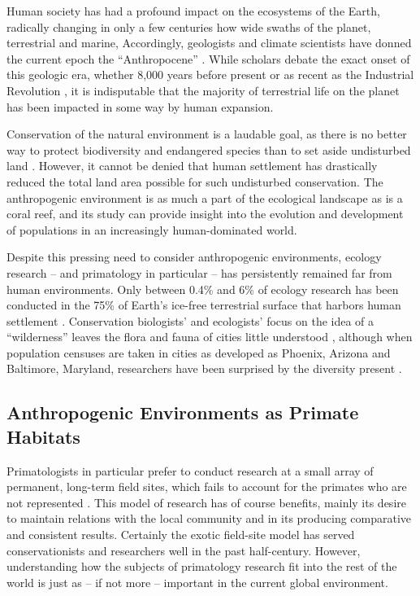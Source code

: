 \documentclass{../../../coursework}
\begin{document}
Human society has had a profound impact on the ecosystems of the Earth,
radically changing in only a few centuries how wide swaths of the planet,
terrestrial and marine, Accordingly, geologists and climate scientists have
donned the current epoch the ``Anthropocene'' \parencite{Cru00,Lew15}. While
scholars debate the exact onset of this geologic era, whether 8,000 years
before present \parencite{Rud03,Kir05} or as recent as the Industrial
Revolution \parencite{Cru02}, it is indisputable that the majority of
terrestrial life on the planet has been impacted in some way by human
expansion. 

Conservation of the natural environment is a laudable goal, as there is no
better way to protect biodiversity and endangered species than to set aside
undisturbed land \parencite{New95,Hat19}. However, it cannot be denied that
human settlement has drastically reduced the total land area possible for such
undisturbed conservation. The anthropogenic environment is as much a part of
the ecological landscape as is a coral reef, and its study can provide insight
into the evolution and development of populations in an increasingly
human-dominated world.

Despite this pressing need to consider anthropogenic environments, ecology
research -- and primatology in particular -- has persistently remained far
from human environments. Only between 0.4\% and 6\% of ecology research has
been conducted in the 75\% of Earth's ice-free terrestrial surface that
harbors human settlement \parencite{Col00,Mil02}. Conservation biologists' and
ecologists' focus on the idea of a ``wilderness'' leaves the flora and fauna
of cities little understood \parencite{Nie99}, although when population
censuses are taken in cities as developed as Phoenix, Arizona and Baltimore,
Maryland, researchers have been surprised by the diversity present
\parencite{Klo99}.

\subsection{Anthropogenic Environments as Primate Habitats}

Primatologists in particular prefer to conduct research at a small array of
permanent, long-term field sites, which fails to account for the primates who
are not represented \parencite{Bez19}. This model of research has of course
benefits, mainly its desire to maintain relations with the local community and
in its producing comparative and consistent results. Certainly the exotic
field-site model has served conservationists and researchers well in the past
half-century. However, understanding how the subjects of primatology research
fit into the rest of the world is just as -- if not more -- important in the
current global environment.
\end{document}
